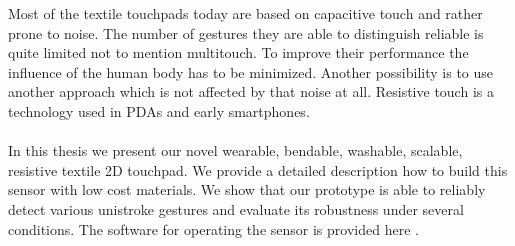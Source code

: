 Most of the textile touchpads today are based on capacitive touch and rather prone to noise. The number of gestures they are able to distinguish reliable is quite limited not to mention multitouch. To improve their performance the influence of the human body has to be minimized. Another possibility is to use another approach which is not affected by that noise at all. Resistive touch is a technology used in PDAs and early smartphones.\\ \\
In this thesis we present our novel wearable, bendable, washable, scalable, resistive textile 2D touchpad. We provide a detailed description how to build this sensor with low cost materials. We show that our prototype is able to reliably detect various unistroke gestures and evaluate its robustness under several conditions. The software for operating the sensor is provided here \cite{software}.
